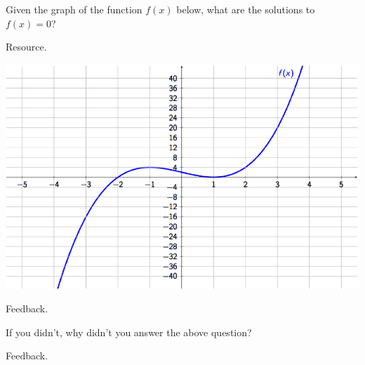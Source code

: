 \documentclass{ximera}
\begin{document}
\begin{problem} 
    Given the graph of the function $f(x)$ below, what are the solutions to $f(x) = 0$?
    
    \begin{hint}
    Resource.
    \end{hint}
       
\begin{center} \includegraphics[scale=0.7]{Graphing1.png} \end{center}
    
  \begin{multipleChoice}
      
     \begin{feedback}[attempt]
      Feedback.
      \end{feedback}
     
  \end{multipleChoice}
  
\begin{question}
  
  If you didn't, why didn't you answer the above question?
  
  \begin{multipleChoice}
      
      \begin{feedback}[attempt]
      Feedback.
      \end{feedback}
      
  \end{multipleChoice}
  
\end{question}

\end{problem}
\end{document}
